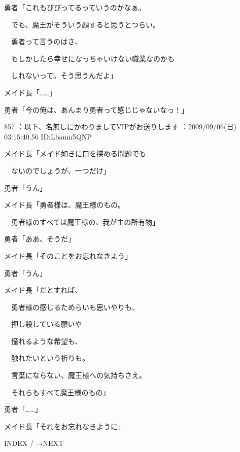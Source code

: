 \documentclass[a4j,twocolumn]{tarticle}
\begin{document}
勇者「これもびびってるっていうのかなぁ。\par{} 
　でも、魔王がそういう顔すると思うとつらい。\par{} 
　勇者って言うのはさ、\par{} 
　もしかしたら幸せになっちゃいけない職業なのかも\par{} 
　しれないって。そう思うんだよ」 



メイド長「……」 



勇者「今の俺は、あんまり勇者って感じじゃないなっ！」 

	
    
    

857 ：以下、名無しにかわりましてVIPがお送りします ：2009/09/06(日) 03:15:40.56 ID:Lbanm5QNP 


メイド長「メイド如きに口を挟める問題でも\par{} 
　ないのでしょうが、一つだけ」 



勇者「うん」 



メイド長「勇者様は、魔王様のもの。\par{} 
　勇者様のすべては魔王様の、我が主の所有物」 



勇者「ああ、そうだ」 



メイド長「そのことをお忘れなきよう」 



勇者「うん」 



メイド長「だとすれば、\par{} 
　勇者様の感じるためらいも思いやりも、\par{} 
　押し殺している願いや\par{} 
　憧れるような希望も、\par{} 
　触れたいという祈りも。\par{} 
　言葉にならない、魔王様への気持ちさえ。\par{} 
　それらもすべて魔王様のもの」 



勇者「……」 



メイド長「それをお忘れなきように」 

	






	
		INDEX
      /
    	→NEXT
	





 
 
 
 
\end{document}
